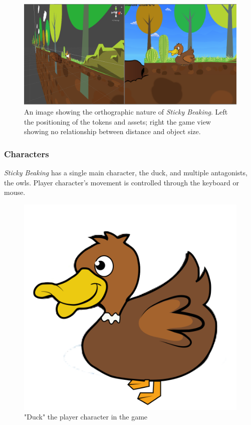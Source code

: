 \documentclass[12pt]{article}
\newcommand{\game}[2]{\textit{#1}}{}
\begin{document}
\begin{figure}[H]
    \centering
    \includegraphics[scale=0.4]{ortho.png}
    \caption{An image showing the orthographic nature of \game{Sticky Beaking}{}. Left the positioning of the tokens and assets; right the game view showing no relationship between distance and object size.}
    \label{fig:orhto}
\end{figure}

\subsubsection{Characters}
\game{Sticky Beaking}{ } has a single main character, the duck, and multiple antagonists, the owls. Player character’s movement is controlled through the keyboard or mouse. 

\begin{figure}[H]
    \centering
    \includegraphics{duck.png}
    \caption{"Duck" the player character in the game}
    \label{fig:Duck}
\end{figure}
\end{document}
